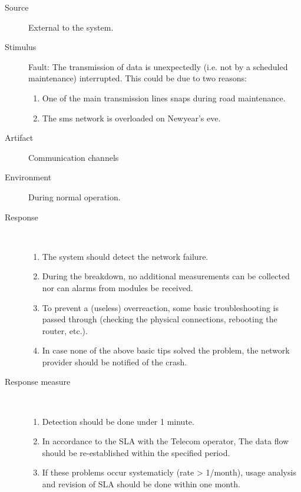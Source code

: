 \begin{description}
	\item[Source] External to the system.
	\item[Stimulus] Fault: The transmission of data is unexpectedly
	(i.e. not by a scheduled maintenance) interrupted.
	This could be due to two reasons:
	\begin{enumerate}
	  \item One of the main transmission lines snaps during road maintenance.
	  \item The sms network is overloaded on Newyear's eve.
	\end{enumerate}
	\item[Artifact] Communication channels
	\item[Environment] During normal operation.
	\item[Response] \
	\begin{enumerate}
	  \item The system should detect the network failure.
	  \item During the breakdown, no additional measurements can be collected nor
	  can alarms from modules be received. 
	  \item To prevent a (useless) overreaction, some basic troubleshooting is
	  passed through (checking the physical connections, rebooting the router,
	  etc.).
	  \item In case none of the above basic tips solved the problem, the network
	  provider should be notified of the crash.
	\end{enumerate}
	\item[Response measure] \
	\begin{enumerate}
	  \item Detection should be done under 1 minute.
	  \item In accordance to the SLA with the Telecom operator, The data flow
	  should be re-established within the specified period.
	  \item If these problems occur systematicly (rate > 1/month), usage
	  analysis and revision of SLA should be done within one month.
	\end{enumerate}
\end{description}